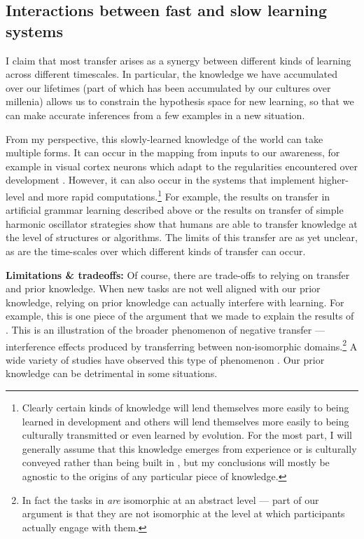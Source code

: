 \subsection{Interactions between fast and slow learning systems} \label{fast_slow_interactions}
I claim that most transfer arises as a synergy between different kinds of learning across different timescales. In particular, the knowledge we have accumulated over our lifetimes (part of which has been accumulated by our cultures over millenia) allows us to constrain the hypothesis space for new learning, so that we can make accurate inferences from a few examples in a new situation. \par 
From my perspective, this slowly-learned knowledge of the world can take multiple forms. It can occur in the mapping from inputs to our awareness, for example in visual cortex neurons which adapt to the regularities encountered over development \citep{Barlow1975}. However, it can also occur in the systems that implement higher-level and more rapid computations.\footnote{Clearly certain kinds of knowledge will lend themselves more easily to being learned in development and others will lend themselves more easily to being culturally transmitted or even learned by evolution. For the most part, I will generally assume that this knowledge emerges from experience or is culturally conveyed rather than being built in \citep{Hansen2017}, but my conclusions will mostly be agnostic to the origins of any particular piece of knowledge.} For example, the results on transfer in artificial grammar learning described above \citep{Tunney2001} or the results on transfer of simple harmonic oscillator strategies \citep{Day2011} show that humans are able to transfer knowledge at the level of structures or algorithms. The limits of this transfer are as yet unclear, as are the time-scales over which different kinds of transfer can occur.\par  
\textbf{Limitations \& tradeoffs:} Of course, there are trade-offs to relying on transfer and prior knowledge. When new tasks are not well aligned with our prior knowledge, relying on prior knowledge can actually interfere with learning. For example, this is one piece of the argument that we made \citep{Lampinen2017b} to explain the results of \citet{Kaminski2008}. This is an illustration of the broader phenomenon of negative transfer --- interference effects produced by transferring between non-isomorphic domains.\footnote{In fact the tasks in \citet{Kaminski2008} \emph{are} isomorphic at an abstract level --- part of our argument is that they are not isomorphic at the level at which participants actually engage with them.} A wide variety of studies have observed this type of phenomenon \citep[e.g.][]{Luchins1942, Landrum2005}. Our prior knowledge can be detrimental in some situations. \par
